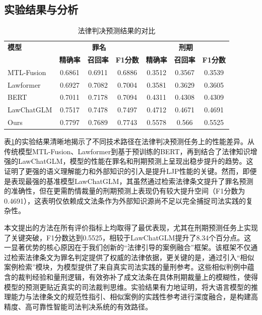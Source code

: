 \subsection{\heiti 实验结果与分析}

\begin{table}[htbp]
	\centering
	\caption{ 法律判决预测结果的对比}
	\begin{tabular}{lcccccc}
		\toprule
		\textbf{模型} & \multicolumn{3}{c}{\textbf{罪名}} & \multicolumn{3}{c}{\textbf{刑期}}                                                               \\
		\cmidrule(lr){2-4} \cmidrule(lr){5-7}
		            & \textbf{精确率}                    & \textbf{召回率}                    & \textbf{F1分数} & \textbf{精确率} & \textbf{召回率} & \textbf{F1分数} \\
		\midrule
		MTL-Fusion  & 0.6861                          & 0.6911                          & 0.6886        & 0.3512       & 0.3567       & 0.3539        \\
		Lawformer   & 0.6927                          & 0.7082                          & 0.7004        & 0.3581       & 0.3629       & 0.3605        \\
		BERT        & 0.7011                          & 0.7178                          & 0.7094        & 0.4311       & 0.4308       & 0.4309        \\
		LawChatGLM  & 0.7517                          & 0.7478                          & 0.7497        & 0.4712       & 0.4671       & 0.4691        \\
		Ours        & 0.7797                          & 0.7689                          & 0.7743        & 0.5578       & 0.566        & 0.5525        \\
		\bottomrule
	\end{tabular}
	\label{tab:performance_comparison}
\end{table}
表\ref{tab:performance_comparison}的实验结果清晰地揭示了不同技术路径在法律判决预测任务上的性能差异。从传统模型MTL-Fusion、Lawformer到基于预训练的BERT，再到结合了法律知识增强的LawChatGLM，模型的性能在罪名和刑期预测上呈现出稳步提升的趋势。这证明了更强的语义理解能力和外部知识的引入是提升LJP性能的关键。然而，即便是表现最强的基准模型LawChatGLM，其虽然通过检索法律条文提升了罪名预测的准确性，但在更需酌情裁量的刑期预测上表现仍有较大提升空间（F1分数为0.4691），这表明仅依赖成文法条作为外部知识源尚不足以完全捕捉司法实践的复杂性。

本文提出的方法在所有评价指标上均取得了最优表现，尤其在刑期预测任务上实现了关键突破，F1分数达到0.5525，相较于LawChatGLM提升了8.34个百分点。这一显著优势的核心原因在于我们创新的“法律引导的案例融合”框架。该框架不仅通过检索法律条文为罪名判定提供了权威的法律依据，更关键的是，通过引入“相似案例检索”模块，为模型提供了来自真实司法实践的量刑参考。这些相似判例中蕴含的裁判经验和量刑逻辑，有效弥补了成文法条在具体刑期裁量上的模糊性，使得模型的预测更贴近真实的司法裁判思维。实验结果有力地证明，将大语言模型的推理能力与法律条文的规范性指引、相似案例的实践性参考进行深度融合，是构建高精度、高可靠性智能司法判决系统的有效路径。

